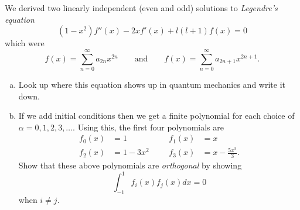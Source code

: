 \documentclass[12pt]{article} %
\begin{document}
\newpage
\begin{problem}
We derived two linearly independent (even and odd) solutions to \emph{Legendre's equation}
\[
(1-x^2)f''(x)-2xf'(x)+l(l+1)f(x)=0
\]
which were
\[
f(x)=\sum_{n=0}^\infty a_{2n}x^{2n} \qquad \textrm{and} \qquad f(x)=\sum_{n=0}^\infty a_{2n+1}x^{2n+1}.
\]
\begin{enumerate}[(a)]
    \item Look up where this equation shows up in quantum mechanics and write it down.
    \item If we add initial conditions then we get a finite polynomial for each choice of $\alpha = 0,1,2,3,\dots$. Using this, the first four polynomials are
    \begin{align*}
        f_0(x)&=1 &&& f_1(x)&=x\\
        f_2(x)&=1-3x^2 &&& f_3(x)&=x-\frac{5x^3}{3}.
    \end{align*}
    Show that these above polynomials are \emph{orthogonal} by showing
    \[
    \int_{-1}^1 f_i(x)f_j(x)dx = 0 
    \]
    when $i\neq j$.
\end{enumerate}
\end{problem}
\end{document}
